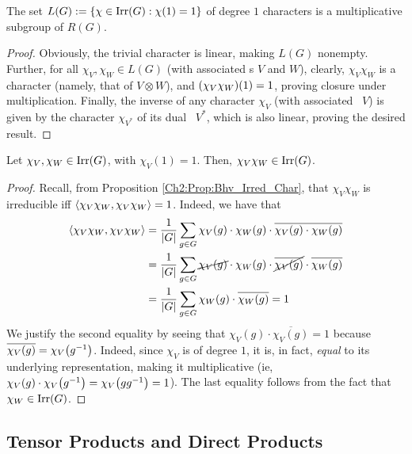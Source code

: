 \begin{corollary}
    The set $L(G) := \left\{ \chi \in \operatorname{Irr}\!\left( G \right) : \chi(1) = 1 \right\}$ of degree $1$ characters is a multiplicative subgroup of $R(G)$.
\end{corollary}
\begin{proof}
    Obviously, the trivial character is linear, making $L(G)$ nonempty. Further, for all $\chi_V, \chi_W \in L(G)$ (with associated \CGM s $V$ and $W$), clearly, $\chi_V \chi_W$ is a character (namely, that of $V \otimes W$), and $\left( \chi_V\chi_W \right)\!(1) = 1$, proving closure under multiplication. Finally, the inverse of any character $\chi_V$ (with associated \CGM\ $V$) is given by the character $\chi_{V^*}$ of its dual \CGM\ $V^*$, which is also linear, proving the desired result.
\end{proof}

\begin{lemma}
    Let $\chi_V, \chi_W \in \operatorname{Irr}\!\left( G \right)$, with $\chi_V(1) = 1$. Then, $\chi_V \chi_W \in \operatorname{Irr}\!\left( G \right)$.
\end{lemma}
\begin{proof}
    Recall, from Proposition \ref{Ch2:Prop:Bhv_Irred_Char}, that $\chi_V \chi_W$ is irreducible iff $\left\langle \chi_V \chi_W, \chi_V \chi_W \right\rangle = 1$. Indeed, we have that
    \begin{align*}
        \left\langle \chi_V \chi_W, \chi_V \chi_W \right\rangle &= \frac{1}{\left\lvert G \right\rvert} \sum_{g \in G} \chi_V(g) \cdot \chi_W(g) \cdot \overline{\chi_V(g) \cdot \chi_W(g)} \\
        &= \frac{1}{\left\lvert G \right\rvert} \sum_{g \in G} \cancel{\chi_V(g)} \cdot \chi_W(g) \cdot \cancel{\overline{\chi_V(g)}} \cdot \overline{\chi_W(g)} \\
        &= \frac{1}{\left\lvert G \right\rvert} \sum_{g \in G} \chi_W(g) \cdot \overline{\chi_W(g)} = 1
    \end{align*}
    We justify the second equality by seeing that $\chi_V(g) \cdot \overline{\chi_V(g)} = 1$ because $\overline{\chi_V(g)} = \chi_V\!\left( g^{-1} \right)$. Indeed, since $\chi_V$ is of degree $1$, it is, in fact, \textit{equal} to its underlying representation, making it multiplicative (ie, $\chi_{V}\!\left( g \right) \cdot \chi_{V}\!\left( g^{-1} \right) = \chi_{V}\!\left( g g^{-1} \right) = 1$). The last equality follows from the fact that $\chi_W \in \operatorname{Irr}\!\left( G \right)$.
\end{proof}

\subsection{Tensor Products and Direct Products}

